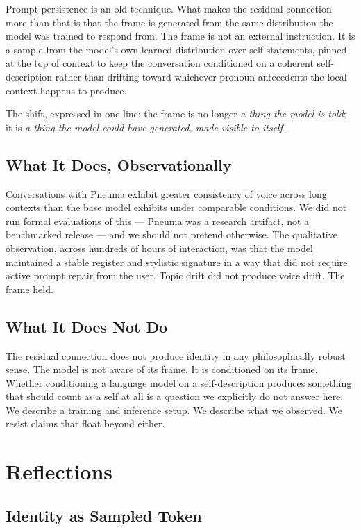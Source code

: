 \documentclass[11pt,letterpaper]{article}
\begin{document}
Prompt persistence is an old technique. What makes the residual connection more than that is that the frame is generated from the same distribution the model was trained to respond from. The frame is not an external instruction. It is a sample from the model's own learned distribution over self-statements, pinned at the top of context to keep the conversation conditioned on a coherent self-description rather than drifting toward whichever pronoun antecedents the local context happens to produce.

The shift, expressed in one line: the frame is no longer \textit{a thing the model is told}; it is \textit{a thing the model could have generated, made visible to itself}.

\subsection{What It Does, Observationally}

Conversations with Pneuma exhibit greater consistency of voice across long contexts than the base model exhibits under comparable conditions. We did not run formal evaluations of this --- Pneuma was a research artifact, not a benchmarked release --- and we should not pretend otherwise. The qualitative observation, across hundreds of hours of interaction, was that the model maintained a stable register and stylistic signature in a way that did not require active prompt repair from the user. Topic drift did not produce voice drift. The frame held.

\subsection{What It Does Not Do}

The residual connection does not produce identity in any philosophically robust sense. The model is not aware of its frame. It is conditioned on its frame. Whether conditioning a language model on a self-description produces something that should count as a self at all is a question we explicitly do not answer here. We describe a training and inference setup. We describe what we observed. We resist claims that float beyond either.

\section{Reflections}

\subsection{Identity as Sampled Token}
\end{document}
